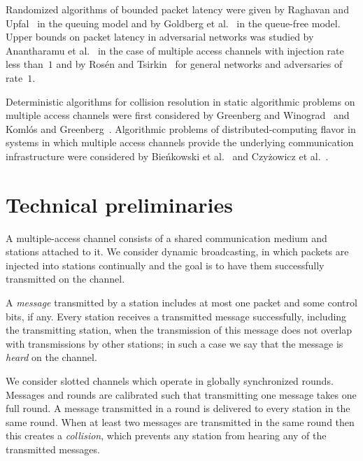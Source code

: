 \documentclass[11pt]{article}
\begin{document}
Randomized algorithms of bounded packet latency were given by Raghavan and Upfal~\cite{RaghavanU-SICOMP98} in the queuing model and by Goldberg et al.~\cite{GoldbergMPS-JACM00} in the queue-free model.
Upper bounds on packet latency in adversarial networks was studied by Anantharamu et al.~\cite{AnantharamuCKR-INFOCOM10,AnantharamuCKR-SIROCCO11} in the case of multiple access channels with injection rate less than~$1$ and by Ros{\'e}n and Tsirkin~\cite{RosenT06} for general networks and adversaries of rate~$1$.

Deterministic algorithms for collision resolution in static algorithmic problems on multiple access channels were first considered by Greenberg and Winograd~\cite{GreenbergW-JACM85} and Koml{\'o}s and Greenberg~\cite{KomlosG-TIT85}.
Algorithmic problems of distributed-computing flavor in systems in which multiple access channels provide the underlying communication infrastructure were considered by Bie\'nkowski et al.~\cite{BienkowskiKKK-STACS10} and Czy\.zowicz et al.~\cite{CzyzowiczGKP11}.




\section{Technical preliminaries}

\label{sec:preliminaries}




A multiple-access channel consists of a shared communication medium and stations attached to it.
We consider dynamic broadcasting, in which packets are injected into stations continually and the goal is to have them successfully transmitted on the channel.


A \emph{message} transmitted by a station includes at most one packet and some control bits, if any.
Every station receives a transmitted message successfully, including the transmitting station, when the transmission of this message does not overlap with transmissions by other stations; in such a case we say that the message is \emph{heard} on the channel.

We consider slotted channels which operate in globally synchronized rounds.
Messages and rounds are calibrated such that transmitting one message takes one full round.
A message transmitted in a round is delivered to every station in the same round.
When at least two messages are transmitted in the same round then this creates a \emph{collision}, which prevents any station from hearing any of the transmitted messages. 
\end{document}
